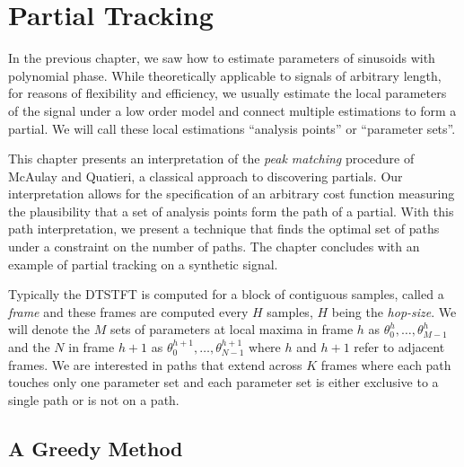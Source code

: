 \chapter{Partial Tracking\label{chap:partialtracking}}

In the previous chapter, we saw how to estimate parameters of sinusoids with
polynomial phase. While theoretically applicable to signals of arbitrary length,
for reasons of flexibility and efficiency, we usually estimate the local
parameters of the signal under a low order model and connect multiple
estimations to form a partial. We will call these local estimations ``analysis
points'' or ``parameter sets''.

This chapter presents an interpretation of the \textit{peak matching} procedure
of McAulay and Quatieri\cite{mcaulay1986speech}, a classical approach to discovering partials. Our
interpretation allows for the specification of an arbitrary cost function
measuring the plausibility that a set of analysis points form the path of a
partial. With this path interpretation, we present a technique that finds the
optimal set of paths under a constraint on the number of paths. The chapter
concludes with an example of partial tracking on a synthetic signal.

Typically the DTSTFT is computed for a block of contiguous samples, called a
\textit{frame} and these frames are computed every $H$ samples, $H$ being the
\textit{hop-size}. We will denote the $M$ sets of parameters at local maxima in
frame $h$ as $\theta_0^{h}, \dotsc, \theta_{M-1}^{h}$ and the $N$ in frame $h+1$
as $\theta_0^{h+1}, \dotsc, \theta_{N-1}^{h+1}$ where $h$ and $h+1$ refer to
adjacent frames. We are interested in paths that extend across $K$ frames where
each path touches only one parameter set and each parameter set is either
exclusive to a single path or is not on a path.


\section{A Greedy Method}

